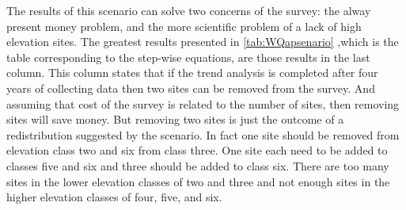 The results of this scenario can solve two concerns of the survey: the alway present money problem, and the more scientific problem of a lack of high elevation sites.
The greatest results presented in \autoref{tab:WQapsenario} ,which is the table corresponding to the step-wise equations, are those results in the last column.
This column states that if the trend analysis is completed after four years of collecting data then two sites can be removed from the survey.
And assuming that cost of the survey is related to the number of sites, then removing sites will save money.
But removing two sites is just the outcome of a redistribution suggested by the scenario.
In fact one site should be removed from elevation class two and six from class three.
One site each need to be added to classes five and six and three should be added to class six.
There are too many sites in the lower elevation classes of two and three and not enough sites in the higher elevation classes of four, five, and six.

